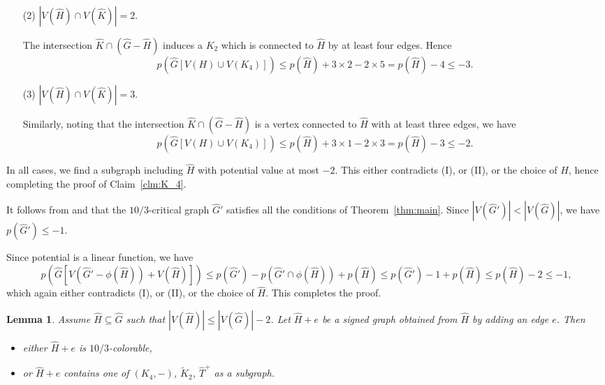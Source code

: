 \documentclass[11pt,a4paper]{article}
\makeatletter
\renewenvironment{proof}[1][\proofname]{\par
	\pushQED{\qed}%
	\normalfont \topsep6\p@\@plus6\p@\relax
	\trivlist
	\item[\hskip\labelsep
	\bfseries
	#1\@addpunct{.}]\ignorespaces
}{%
	\popQED\endtrivlist\@endpefalse
}
\newtheorem{lemma}[theorem]{Lemma}
\theoremstyle{definition}
\makeatother
\begin{document}
\begin{proof}
\begin{itemize}
		
		\item[(2)] $|V(\widehat{H}) \cap V(\widehat{K})|=2$.
		
		The intersection $\widehat{K}\cap (\widehat{G}-\widehat{H})$ induces a $K_{2}$ which is connected to $\widehat{H}$ by at least four edges. Hence $$p(\widehat{G}[V(H)\cup V(K_4)])\leq p(\widehat{H})+3\times 2-2\times 5=p(\widehat{H})-4\leq -3.$$ 
		
		
		\item[(3)] $|V(\widehat{H}) \cap V(\widehat{K})|=3$.
		
		Similarly, noting that the  intersection $\widehat{K}\cap (\widehat{G}-\widehat{H})$ is a vertex connected to $\widehat{H}$ with at least three edges, we have
		$$p(\widehat{G}[V(H)\cup V(K_4)])\leq p(\widehat{H})+3\times 1-2\times 3=p(\widehat{H})-3\leq -2.$$ 
		
	\end{itemize}
	
	In all cases, we find a subgraph including $\widehat{H}$ with potential value at most $-2$. This either contradicts (I), or  (II), or the choice of $\widehat{H}$, hence completing the proof of Claim~\ref{clm:K_4}.
	\bigskip
	
	It follows from  and  that the $10/3$-critical graph $\widehat{G}'$ satisfies all the conditions of Theorem~\ref{thm:main}. Since $|V(\widehat{G}')|<|V(\widehat{G})|$, we have $p(\widehat{G}')\leq -1$.
	
Since potential is a linear function, we have 	$$p(\widehat{G}[V(\widehat{G}'-\phi(\widehat{H}))+V(\widehat{H})])\leq p(\widehat{G}')-p(\widehat{G}'\cap \phi(\widehat{H}))+p(\widehat{H})\leq p(\widehat{G}')-1+p(\widehat{H})\leq p(\widehat{H})-2\leq -1, $$
	which again either contradicts  (I), or  (II), or the choice of $\widehat{H}$. This completes the proof.
\end{proof}

\begin{lemma}\label{lem:adding}
	Assume $\widehat{H}\subseteq\widehat{G}$ such that $|V(\widehat{H})|\leq |V(\widehat{G})|-2$. Let $\widehat{H}+e$ be a signed graph obtained from $\widehat{H}$ by adding an edge $e$. Then 
	\begin{itemize}
		\item either $\widehat{H}+e$ is $10/3$-colorable,
		\item or $\widehat{H}+e$ contains one of $(K_4,-)$, $\widetilde{K}_2$, $\widehat{T}^+$ as a subgraph.
	\end{itemize}
\end{lemma}
\end{document}
